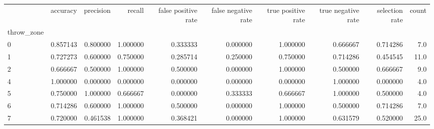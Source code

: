 \begin{tabular}{lrrrrrrrrr}
\toprule
{} &  accuracy &  precision &    recall &  false positive rate &  false negative rate &  true positive rate &  true negative rate &  selection rate &  count \\
throw\_zone &           &            &           &                      &                      &                     &                     &                 &        \\
\midrule
0          &  0.857143 &   0.800000 &  1.000000 &             0.333333 &             0.000000 &            1.000000 &            0.666667 &        0.714286 &    7.0 \\
1          &  0.727273 &   0.600000 &  0.750000 &             0.285714 &             0.250000 &            0.750000 &            0.714286 &        0.454545 &   11.0 \\
2          &  0.666667 &   0.500000 &  1.000000 &             0.500000 &             0.000000 &            1.000000 &            0.500000 &        0.666667 &    9.0 \\
4          &  1.000000 &   0.000000 &  0.000000 &             0.000000 &             0.000000 &            0.000000 &            1.000000 &        0.000000 &    4.0 \\
5          &  0.750000 &   1.000000 &  0.666667 &             0.000000 &             0.333333 &            0.666667 &            1.000000 &        0.500000 &    4.0 \\
6          &  0.714286 &   0.600000 &  1.000000 &             0.500000 &             0.000000 &            1.000000 &            0.500000 &        0.714286 &    7.0 \\
7          &  0.720000 &   0.461538 &  1.000000 &             0.368421 &             0.000000 &            1.000000 &            0.631579 &        0.520000 &   25.0 \\
\bottomrule
\end{tabular}
